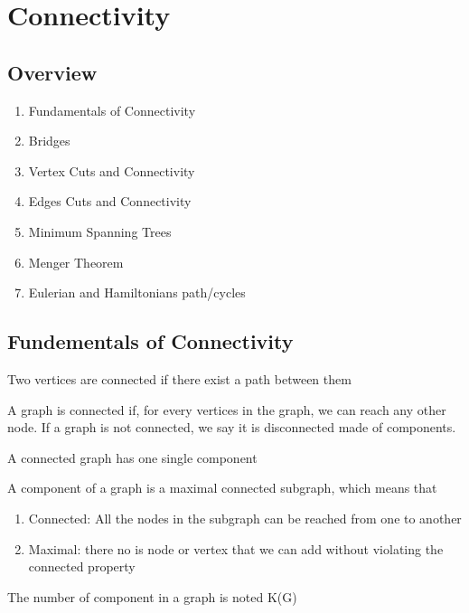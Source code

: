 \documentclass{article}
\begin{document}
\section{Connectivity}

\subsection{Overview}%
\label{sub:Overview}

\begin{enumerate}
    \item Fundamentals of Connectivity
    \item Bridges
    \item Vertex Cuts and Connectivity
    \item Edges Cuts and Connectivity
    \item Minimum Spanning Trees
    \item Menger Theorem
    \item Eulerian and Hamiltonians path/cycles
\end{enumerate}

\subsection{Fundementals of Connectivity}

\begin{definition}
    Two vertices are connected if there exist a path between them
\end{definition}

\begin{definition}
    A graph is connected if, for every vertices in the graph, we can
    reach any other node. If a graph is not connected, we say it is
    disconnected made of components.
\end{definition}

\begin{remark}
    A connected graph has one single component
\end{remark}

\begin{definition}
    A component of a graph is a maximal connected subgraph, which means
    that
    \begin{enumerate}
	\item Connected: All the nodes in the subgraph can be reached
	    from one to another
	\item Maximal: there no is node or vertex that we can add without
	    violating the connected property
    \end{enumerate}
    The number of component in a graph is noted K(G)
\end{definition}
\end{document}
